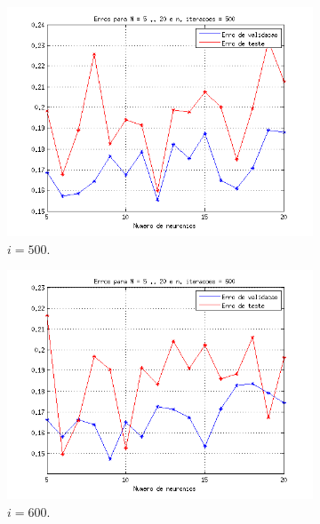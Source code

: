 \begin{figure}[H]
			\begin{subfigure}{.33\textwidth}
				  \centering
				  \includegraphics[width=1\linewidth]{image/mlp_500_iterations}
				  \caption{\(i=500\).}
				\end{subfigure}%
				\begin{subfigure}{.33\textwidth}
				  \centering
				  \includegraphics[width=1\linewidth]{image/mlp_600_iterations}
				  \caption{\(i=600\).}
			\end{subfigure}
			\begin{subfigure}{.33\textwidth}
				  \centering

\end{subfigure}
\end{figure}
